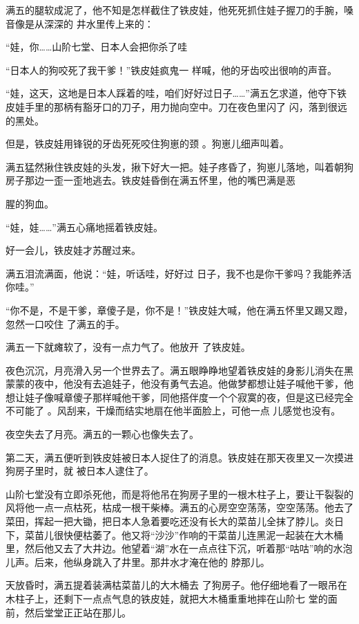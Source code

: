 \documentclass{article}
\begin{document}
满五的腿软成泥了，他不知是怎样截住了铁皮娃，他死死抓住娃子握刀的手腕，嗓音像是从深深的
井水里传上来的： 

“娃，你……山阶七堂、日本人会把你杀了哇

“日本人的狗咬死了我干爹！”铁皮娃疯鬼一
样喊，他的牙齿咬出很响的声音。 

“娃，这天，这地是日本人踩着的哇，咱们好好过日子……”满五乞求道，他夺下铁皮娃手里的那柄有豁牙口的刀子，用力抛向空中。刀在夜色里闪了
闪，落到很远的黑处。 

但是，铁皮娃用锋锐的牙齿死死咬住狗崽的颈
。狗崽儿细声叫着。 

满五猛然揪住铁皮娃的头发，揪下好大一把。娃子疼昏了，狗崽儿落地，叫着朝狗房子那边一歪一歪地逃去。铁皮娃昏倒在满五怀里，他的嘴巴满是恶
\newpage

腥的狗血。 


“娃，娃……”满五心痛地摇着铁皮娃。 


好一会儿，铁皮娃才苏醒过来。 

满五泪流满面，他说：“娃，听话哇，好好过
日子，我不也是你干爹吗？我能养活你哇。” 

“你不是，不是干爹，章傻子是，你不是！”铁皮娃大喊，他在满五怀里又踢又蹬，忽然一口咬住
了满五的手。 

满五一下就瘫软了，没有一点力气了。他放开
了铁皮娃。 

夜色沉沉，月亮滑入另一个世界去了。满五眼睁睁地望着铁皮娃的身影儿消失在黑蒙蒙的夜中，他没有去追娃子，他没有勇气去追。他做梦都想让娃子喊他干爹，他想让娃子像喊章傻子那样喊他干爹，同他搭伴度一个个寂寞的夜，但是这已经完全不可能了
\newpage
。风刮来，干燥而结实地扇在他半面脸上，可他一点
儿感觉也没有。 

夜空失去了月亮。满五的一颗心也像失去了。

第二天，满五便听到铁皮娃被日本人捉住了的消息。铁皮娃在那天夜里又一次摸进狗房子里时，就
被日本人逮住了。 

山阶七堂没有立即杀死他，而是将他吊在狗房子里的一根木柱子上，要让干裂裂的风将他一点一点枯死，枯成一根干柴棒。满五的心房空空荡荡，空空荡荡。他去了菜田，挥起一把大锄，把日本人急着要吃还没有长大的菜苗儿全抹了脖儿。炎日下，菜苗儿很快便枯萎了。他又将“沙沙”作响的干菜苗儿连黑泥一起装在大木桶里，然后他又去了大井边。他望着“湖”水在一点点往下沉，听着那“咕咕”响的水泡儿声。后来，他纵身跳入了井里。那井水才淹在他的
脖那儿。 

天放昏时，满五提着装满枯菜苗儿的大木桶去
\newpage
了狗房子。他仔细地看了一眼吊在木柱子上，还剩下一点点气息的铁皮娃，就把大木桶重重地摔在山阶七
堂的面前，然后堂堂正正站在那儿。 
\end{document}
